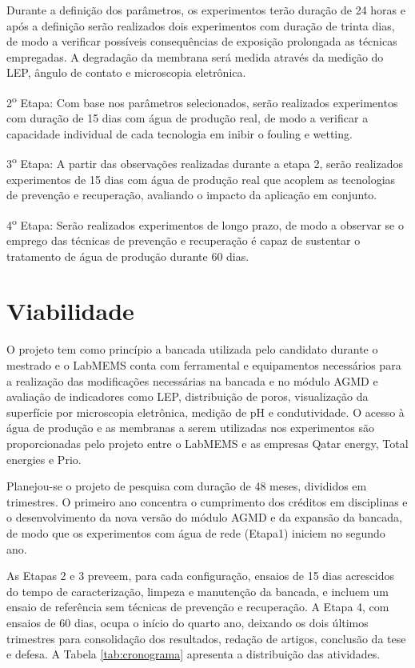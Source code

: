\documentclass[a4paper,12pt]{article}
\begin{document}
Durante a definição dos parâmetros, os experimentos terão duração de 24 horas e após a definição serão realizados dois experimentos com duração de trinta dias, de modo a verificar possíveis consequências de exposição prolongada as técnicas empregadas. A degradação da membrana será medida através da medição do LEP, ângulo de contato e microscopia eletrônica.

2\textsuperscript{o} Etapa: Com base nos parâmetros selecionados, serão realizados experimentos com duração de 15 dias com água de produção real, de modo a verificar a capacidade individual de cada tecnologia em inibir o fouling e wetting.

3\textsuperscript{o} Etapa: A partir das observações realizadas durante a etapa 2, serão realizados experimentos de 15 dias com água de produção real que acoplem as tecnologias de prevenção e recuperação, avaliando o impacto da aplicação em conjunto.

4\textsuperscript{o} Etapa: Serão realizados experimentos de longo prazo, de modo a observar se o emprego das técnicas de prevenção e recuperação é capaz de sustentar o tratamento de água de produção durante 60 dias. 


\section{Viabilidade}

O projeto tem como princípio a bancada utilizada pelo candidato durante o mestrado e o LabMEMS conta com ferramental e equipamentos necessários para a realização das modificações necessárias na bancada e no módulo AGMD e avaliação de indicadores como LEP, distribuição de poros, visualização da superfície por microscopia eletrônica, medição de pH e condutividade. O acesso à água de produção e as membranas a serem utilizadas nos experimentos são proporcionadas pelo projeto entre o LabMEMS e as empresas Qatar energy, Total energies e Prio. 

Planejou-se o projeto de pesquisa com duração de 48 meses, divididos em trimestres. O primeiro ano concentra o cumprimento dos créditos em disciplinas e o desenvolvimento da nova versão do módulo AGMD e da expansão da bancada, de modo que os experimentos com água de rede (Etapa1) iniciem no segundo ano. 

As Etapas 2 e 3 preveem, para cada configuração, ensaios de 15 dias acrescidos do tempo de caracterização, limpeza e manutenção da bancada, e incluem um ensaio de referência sem técnicas de prevenção e recuperação. A Etapa 4, com ensaios de 60 dias, ocupa o início do quarto ano, deixando os dois últimos trimestres para consolidação dos resultados, redação de artigos, conclusão da tese e defesa. A Tabela \ref{tab:cronograma} apresenta a distribuição das atividades.
\end{document}
